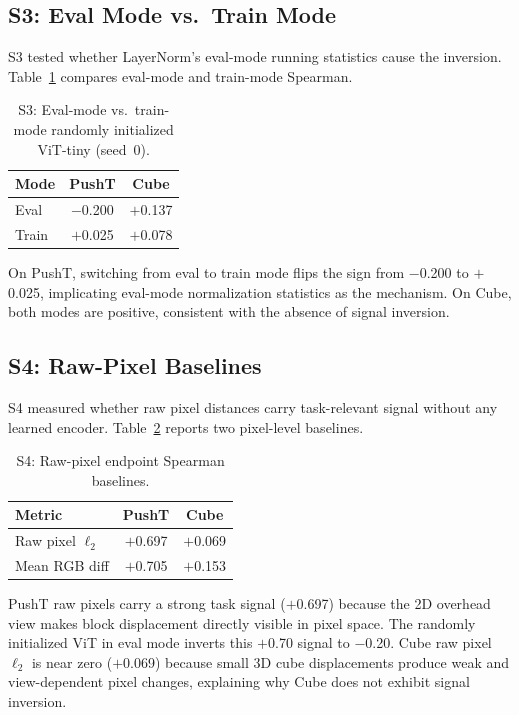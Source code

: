 \subsection{S3: Eval Mode vs.\ Train Mode}
\label{app:s3}

S3 tested whether LayerNorm's eval-mode running statistics cause the
inversion.  Table~\ref{tab:s3} compares eval-mode and train-mode Spearman.

\begin{table}[h]
\centering
\caption{S3: Eval-mode vs.\ train-mode randomly initialized ViT-tiny (seed~0).}
\label{tab:s3}
\begin{tabular}{lcc}
\toprule
Mode & PushT & Cube \\
\midrule
Eval & $-$0.200 & $+$0.137 \\
Train & $+$0.025 & $+$0.078 \\
\bottomrule
\end{tabular}
\end{table}

On PushT, switching from eval to train mode flips the sign from $-$0.200 to
$+$0.025, implicating eval-mode normalization statistics as the mechanism.
On Cube, both modes are positive, consistent with the absence of signal
inversion.

\subsection{S4: Raw-Pixel Baselines}
\label{app:s4}

S4 measured whether raw pixel distances carry task-relevant signal without
any learned encoder.  Table~\ref{tab:s4} reports two pixel-level baselines.

\begin{table}[h]
\centering
\caption{S4: Raw-pixel endpoint Spearman baselines.}
\label{tab:s4}
\begin{tabular}{lcc}
\toprule
Metric & PushT & Cube \\
\midrule
Raw pixel $\ell_2$ & $+$0.697 & $+$0.069 \\
Mean RGB diff & $+$0.705 & $+$0.153 \\
\bottomrule
\end{tabular}
\end{table}

PushT raw pixels carry a strong task signal ($+$0.697) because the 2D
overhead view makes block displacement directly visible in pixel space.  The
randomly initialized ViT in eval mode inverts this $+$0.70 signal to $-$0.20.  Cube
raw pixel $\ell_2$ is near zero ($+$0.069) because small 3D cube
displacements produce weak and view-dependent pixel changes, explaining why
Cube does not exhibit signal inversion.

